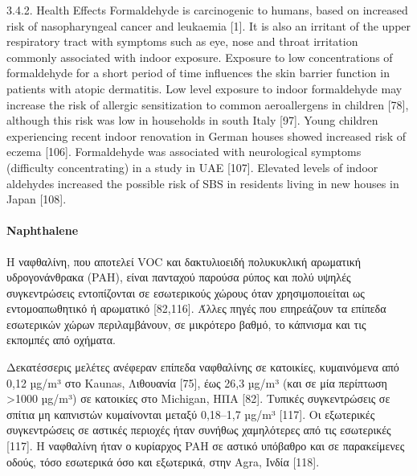 3.4.2. Health Effects
Formaldehyde is carcinogenic to humans, based on increased risk of nasopharyngeal cancer and leukaemia [1]. It is also an irritant of the upper respiratory tract with symptoms such as eye, nose and throat irritation commonly associated with indoor exposure. Exposure to low concentrations of formaldehyde for a short period of time influences the skin barrier function in patients with atopic dermatitis. Low level exposure to indoor formaldehyde may increase the risk of allergic sensitization to common aeroallergens in children [78], although this risk was low in households in south Italy [97]. Young children experiencing recent indoor renovation in German houses showed increased risk of eczema [106]. Formaldehyde was associated with neurological symptoms (difficulty concentrating) in a study in UAE [107]. Elevated levels of indoor aldehydes increased the possible risk of SBS in residents living in new houses in Japan [108].

\paragraph{Naphthalene}

Η ναφθαλίνη, που αποτελεί VOC και δακτυλιοειδή πολυκυκλική αρωματική υδρογονάνθρακα (PAH), είναι πανταχού παρούσα ρύπος και πολύ υψηλές συγκεντρώσεις εντοπίζονται σε εσωτερικούς χώρους όταν χρησιμοποιείται ως εντομοαπωθητικό ή αρωματικό [82,116]. Άλλες πηγές που επηρεάζουν τα επίπεδα εσωτερικών χώρων περιλαμβάνουν, σε μικρότερο βαθμό, το κάπνισμα και τις εκπομπές από οχήματα.

Δεκατέσσερις μελέτες ανέφεραν επίπεδα ναφθαλίνης σε κατοικίες, κυμαινόμενα από 0,12 µg/m³ στο Kaunas, Λιθουανία [75], έως 26,3 µg/m³ (και σε μία περίπτωση >1000 µg/m³) σε κατοικίες στο Michigan, ΗΠΑ [82]. Τυπικές συγκεντρώσεις σε σπίτια μη καπνιστών κυμαίνονται μεταξύ 0,18–1,7 µg/m³ [117]. Οι εξωτερικές συγκεντρώσεις σε αστικές περιοχές ήταν συνήθως χαμηλότερες από τις εσωτερικές [117]. Η ναφθαλίνη ήταν ο κυρίαρχος PAH σε αστικό υπόβαθρο και σε παρακείμενες οδούς, τόσο εσωτερικά όσο και εξωτερικά, στην Agra, Ινδία [118].


